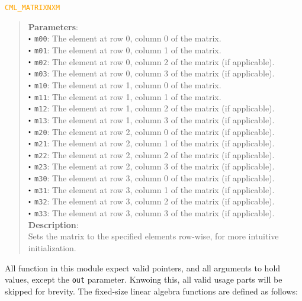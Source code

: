 \documentclass[a4paper,oneside,8pt]{extarticle}
\newcommand{\macro}[1]{
  \noindent\textcolor{orange}{\texttt{#1}}
  \vspace{-0.3em}
}
\renewcommand{\dot}{\raisebox{0.3ex}{\scalebox{0.6}{$\bullet$}}}
\theoremstyle{definition}
\begin{document}
\macro{CML\_MATRIXNXM}
\begin{quote}
  \textbf{Parameters}: \\
  $\dot$ \texttt{m00}: The element at row 0, column 0 of the matrix. \\
  $\dot$ \texttt{m01}: The element at row 0, column 1 of the matrix. \\
  $\dot$ \texttt{m02}: The element at row 0, column 2 of the matrix (if applicable). \\
  $\dot$ \texttt{m03}: The element at row 0, column 3 of the matrix (if applicable). \\
  $\dot$ \texttt{m10}: The element at row 1, column 0 of the matrix. \\
  $\dot$ \texttt{m11}: The element at row 1, column 1 of the matrix. \\
  $\dot$ \texttt{m12}: The element at row 1, column 2 of the matrix (if applicable). \\
  $\dot$ \texttt{m13}: The element at row 1, column 3 of the matrix (if applicable). \\
  $\dot$ \texttt{m20}: The element at row 2, column 0 of the matrix (if applicable). \\
  $\dot$ \texttt{m21}: The element at row 2, column 1 of the matrix (if applicable). \\
  $\dot$ \texttt{m22}: The element at row 2, column 2 of the matrix (if applicable). \\
  $\dot$ \texttt{m23}: The element at row 2, column 3 of the matrix (if applicable). \\
  $\dot$ \texttt{m30}: The element at row 3, column 0 of the matrix (if applicable). \\
  $\dot$ \texttt{m31}: The element at row 3, column 1 of the matrix (if applicable). \\
  $\dot$ \texttt{m32}: The element at row 3, column 2 of the matrix (if applicable). \\
  $\dot$ \texttt{m33}: The element at row 3, column 3 of the matrix (if applicable). \\

  \vspace{-0.75em}
  \textbf{Description}: \\
  Sets the matrix to the specified elements row-wise, for more intuitive initialization. \\
\end{quote}

All function in this module expect valid pointers, and all arguments to hold values, except the \texttt{out} parameter. Knwoing this, all valid usage parts will be skipped for brevity. The fixed-size linear algebra functions are defined as follows: \newline
\end{document}

